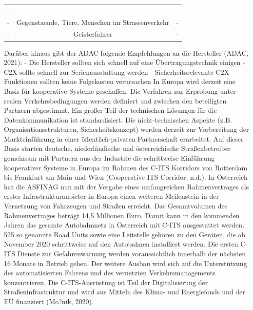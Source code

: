 \documentclass[
]{book}
\begin{document}
\begin{longtable}[]{@{}ccc@{}}
\begin{minipage}[t]{0.30\columnwidth}
-\strut
\end{minipage}\tabularnewline
\begin{minipage}[t]{0.30\columnwidth}\centering
-\strut
\end{minipage} & \begin{minipage}[t]{0.30\columnwidth}\centering
Gegenstaende, Tiere, Menschen im Strassenverkehr\strut
\end{minipage} & \begin{minipage}[t]{0.30\columnwidth}\centering
-\strut
\end{minipage}\tabularnewline
\begin{minipage}[t]{0.30\columnwidth}\centering
-\strut
\end{minipage} & \begin{minipage}[t]{0.30\columnwidth}\centering
Geisterfahrer\strut
\end{minipage} & \begin{minipage}[t]{0.30\columnwidth}\centering
-\strut
\end{minipage}\tabularnewline
\bottomrule
\end{longtable}

Darüber hinaus gibt der ADAC folgende Empfehlungen an die Hersteller (ADAC, 2021):
- Die Hersteller sollten sich schnell auf eine Übertragungstechnik einigen
- C2X sollte schnell zur Serienausstattung werden
- Sicherheitsrelevante C2X-Funktionen sollten keine Folgekosten verursachen
In Europa wird derzeit eine Basis für kooperative Systeme geschaffen. Die Verfahren zur Erprobung unter realen Verkehrsbedingungen werden definiert und zwischen den beteiligten Partnern abgestimmt. Ein großer Teil der technischen Lösungen für die Datenkommunikation ist standardisiert. Die nicht-technischen Aspekte (z.B. Organisationsstrukturen, Sicherheitskonzept) werden derzeit zur Vorbereitung der Markteinführung in einer öffentlich-privaten Partnerschaft erarbeitet.
Auf dieser Basis starten deutsche, niederländische und österreichische Straßenbetreiber gemeinsam mit Partnern aus der Industrie die schrittweise Einführung kooperativer Systeme in Europa im Rahmen des C-ITS Korridors von Rotterdam bis Frankfurt am Main und Wien (Cooperative ITS Corridor, n.d.).
In Österreich hat die ASFINAG nun mit der Vergabe eines umfangreichen Rahmenvertrages als erster Infrastrukturanbieter in Europa einen weiteren Meilenstein in der Vernetzung von Fahrzeugen und Straßen erreicht. Das Gesamtvolumen des Rahmenvertrages beträgt 14,5 Millionen Euro. Damit kann in den kommenden Jahren das gesamte Autobahnnetz in Österreich mit C-ITS ausgestattet werden. 525 so genannte Road Units sowie eine Leitstelle gehören zu den Geräten, die ab November 2020 schrittweise auf den Autobahnen installiert werden. Die ersten C-ITS Dienste zur Gefahrenwarnung werden voraussichtlich innerhalb der nächsten 16 Monate in Betrieb gehen. Der weitere Ausbau wird sich auf die Unterstützung des automatisierten Fahrens und des vernetzten Verkehrsmanagements konzentrieren. Die C-ITS-Ausrüstung ist Teil der Digitalisierung der Straßeninfrastruktur und wird aus Mitteln des Klima- und Energiefonds und der EU finanziert (Mo?nik, 2020).
\end{document}
